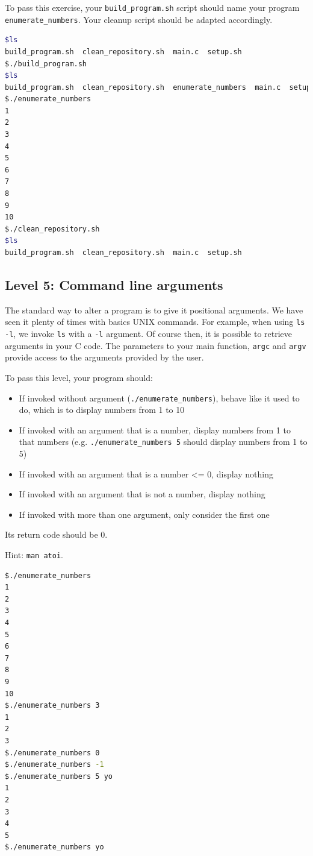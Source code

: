 \documentclass[12pt]{article}
\begin{document}
To pass this exercise, your \texttt{build\_program.sh} script should name your program \texttt{enumerate\_numbers}. Your cleanup script should be adapted accordingly.

\begin{lstlisting}[language=bash]
$ls
build_program.sh  clean_repository.sh  main.c  setup.sh
$./build_program.sh
$ls
build_program.sh  clean_repository.sh  enumerate_numbers  main.c  setup.sh
$./enumerate_numbers
1
2
3
4
5
6
7
8
9
10
$./clean_repository.sh
$ls
build_program.sh  clean_repository.sh  main.c  setup.sh
\end{lstlisting}

\subsection{Level 5: Command line arguments}

The standard way to alter a program is to give it positional arguments. We have seen it plenty of times with basics UNIX commands. For example, when using \texttt{ls -l}, we invoke \texttt{ls} with a \texttt{-l} argument.
Of course then, it is possible to retrieve arguments in your C code. The parameters to your main function, \texttt{argc} and \texttt{argv} provide access to the arguments provided by the user.

To pass this level, your program should:
\begin{itemize}
	\item If invoked without argument (\texttt{./enumerate\_numbers}), behave like it used to do, which is to display numbers from 1 to 10
	\item If invoked with an argument that is a number, display numbers from 1 to that numbers (e.g. \texttt{./enumerate\_numbers 5} should display numbers from 1 to 5)
	\item If invoked with an argument that is a number <= 0, display nothing
	\item If invoked with an argument that is not a number, display nothing
	\item If invoked with more than one argument, only consider the first one
\end{itemize}

Its return code should be 0.

Hint: \texttt{man atoi}.

\begin{lstlisting}[language=bash]
$./enumerate_numbers
1
2
3
4
5
6
7
8
9
10
$./enumerate_numbers 3
1
2
3
$./enumerate_numbers 0
$./enumerate_numbers -1
$./enumerate_numbers 5 yo
1
2
3
4
5
$./enumerate_numbers yo
\end{lstlisting}
\end{document}
